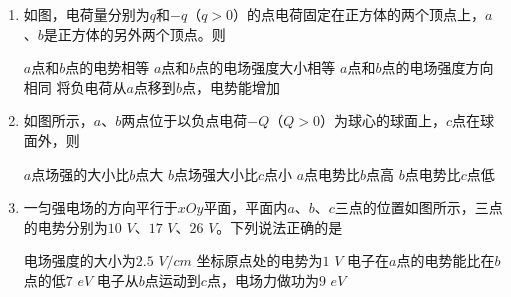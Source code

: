 
\begin{enumerate} [leftmargin=0em]
\renewcommand{\labelenumi}{\arabic{enumi}.}
\item
{}
如图，电荷量分别为$ q $和$ -q $（$ q>0 $）的点电荷固定在正方体的两个顶点上，$ a $、$ b $是正方体的另外两个顶点。则  
\begin{figure}[h!]
\centering

\end{figure}

\fourchoices
{$ a $点和$ b $点的电势相等}
{$ a $点和$ b $点的电场强度大小相等}
{$ a $点和$ b $点的电场强度方向相同}
{将负电荷从$ a $点移到$ b $点，电势能增加}





\item
{}
如图所示，$ a $、$ b $两点位于以负点电荷$ - Q $（$ Q>0 $）为球心的球面上，$ c $点在球面外，则  
\begin{figure}[h!]
\centering

\end{figure}





\fourchoices
{$ a $点场强的大小比$ b $点大}
{$ b $点场强大小比$ c $点小}
{$ a $点电势比$ b $点高}
{$ b $点电势比$ c $点低}






\item
{}
一匀强电场的方向平行于$ xOy $平面，平面内$ a $、$ b $、$ c $三点的位置如图所示，三点的电势分别为$ 10 $ $ V $、$ 17 $ $ V $、$ 26 $ $ V $。下列说法正确的是  


\begin{minipage}[h!]{0.7\linewidth}
\vspace{0.3em}
\fourchoices
{电场强度的大小为$ 2.5 $ $ V/cm $}
{坐标原点处的电势为$ 1 $ $ V $}
{电子在$ a $点的电势能比在$ b $点的低$ 7 $ $ eV $}
{电子从$ b $点运动到$ c $点，电场力做功为$ 9 $ $ eV $}

\vspace{0.3em}
\end{minipage}
\hfill
\begin{minipage}[h!]{0.3\linewidth}
\flushright
\vspace{0.3em}

\vspace{0.3em}
\end{minipage}





\end{enumerate}
